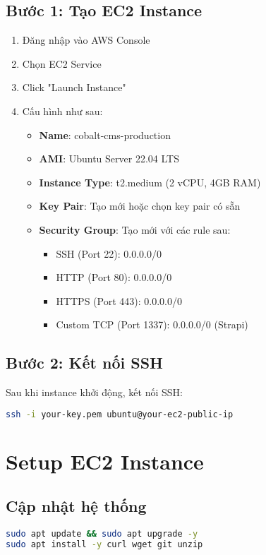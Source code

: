 \documentclass[12pt,a4paper]{article}
\begin{document}
\subsection{Bước 1: Tạo EC2 Instance}
\begin{enumerate}
    \item Đăng nhập vào AWS Console
    \item Chọn EC2 Service
    \item Click "Launch Instance"
    \item Cấu hình như sau:
    \begin{itemize}
        \item \textbf{Name}: cobalt-cms-production
        \item \textbf{AMI}: Ubuntu Server 22.04 LTS
        \item \textbf{Instance Type}: t2.medium (2 vCPU, 4GB RAM)
        \item \textbf{Key Pair}: Tạo mới hoặc chọn key pair có sẵn
        \item \textbf{Security Group}: Tạo mới với các rule sau:
        \begin{itemize}
            \item SSH (Port 22): 0.0.0.0/0
            \item HTTP (Port 80): 0.0.0.0/0
            \item HTTPS (Port 443): 0.0.0.0/0
            \item Custom TCP (Port 1337): 0.0.0.0/0 (Strapi)
        \end{itemize}
    \end{itemize}
\end{enumerate}

\subsection{Bước 2: Kết nối SSH}
Sau khi instance khởi động, kết nối SSH:
\begin{lstlisting}[language=bash]
ssh -i your-key.pem ubuntu@your-ec2-public-ip
\end{lstlisting}

\section{Setup EC2 Instance}

\subsection{Cập nhật hệ thống}
\begin{lstlisting}[language=bash]
sudo apt update && sudo apt upgrade -y
sudo apt install -y curl wget git unzip
\end{lstlisting}
\end{document}
